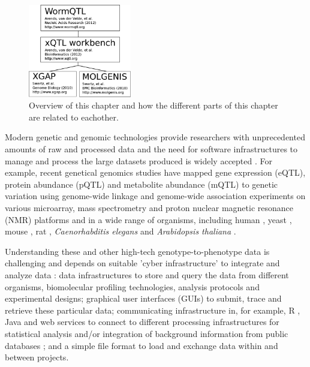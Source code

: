 \newpage

\begin{figure}
  \centering
  \includegraphics[width=0.4\textwidth]{eps/image_5_0.eps}
  \caption[Overview]
    {Overview of this chapter and how the different parts of this chapter are related to eachother.}
    \label{fig:Overview}
\end{figure}

Modern genetic and genomic technologies provide researchers with unprecedented amounts of raw and processed 
data and the need for software infrastructures to manage and process the large datasets produced is widely 
accepted \cite{Swertz:2004, Stein:2008, Thorisson:2009}. For example, recent genetical genomics 
\cite{Swertz:2004, Stein:2008, Thorisson:2009} studies have mapped gene expression (eQTL), 
protein abundance (pQTL) and metabolite abundance (mQTL) to genetic variation using genome-wide linkage and 
genome-wide association experiments on various microarray, mass spectrometry and proton nuclear magnetic 
resonance (NMR) platforms and in a wide range of organisms, including human \cite{Goring:2007, Tanaka:2009, 
Heap:2009}, yeast \cite{Brem:2002, Brem:2005}, mouse \cite{Bystrykh:2005}, rat \cite{Ramos:1999}, 
\emph{Caenorhabditis elegans} \cite{Li:2010} and \emph{Arabidopsis thaliana} \cite{Keurentjes:2006, Keurentjes:2007, Fu:2009}.

Understanding these and other high-tech genotype-to-phenotype data is challenging and depends on suitable 
'cyber infrastructure' to integrate and analyze data \cite{Stein:2008, Fay:2008}: data infrastructures to store and query the 
data from different organisms, biomolecular profiling technologies, analysis protocols and experimental 
designs; graphical user interfaces (GUIs) to submit, trace and retrieve these particular data; communicating 
infrastructure in, for example, R \cite{Ihaka:1996}, Java and web services to connect to different processing infrastructures 
for statistical analysis \cite{Alberts:2008, Fu:2007} and/or integration of background information from public 
databases \cite{Smedley:2008}; and a simple file format to load and exchange data within and between projects.

